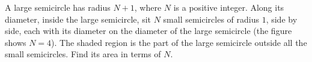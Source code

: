 A large semicircle has radius $N+1$, where $N$ is a positive integer. Along its diameter, inside the large semicircle, sit $N$ small semicircles of radius $1$, side by side, each with its diameter on the diameter of the large semicircle (the figure shows $N=4$). The shaded region is the part of the large semicircle outside all the small semicircles. Find its area in terms of $N$.
